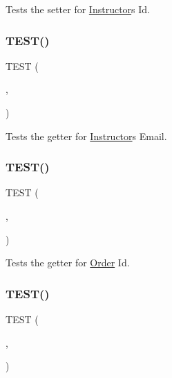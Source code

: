 Tests the setter for \hyperlink{classInstructor}{Instructor}\textquotesingle{}s Id. \mbox{\label{group__group2_ga14b68f5d4a879f5c32075d25bcd1b058}} 
\subsubsection{\texorpdfstring{T\+E\+S\+T()}{TEST()}\hspace{0.1cm}{\footnotesize\ttfamily [37/54]}}
{\footnotesize\ttfamily T\+E\+ST (\begin{DoxyParamCaption}\item[{instructor\+Test}]{,  }\item[{get\+Instr\+Id\+Test}]{ }\end{DoxyParamCaption})}

Tests the getter for \hyperlink{classInstructor}{Instructor}\textquotesingle{}s Email. \mbox{\label{group__group2_gab3cc359b32bb3e07aece88abee38991d}} 
\subsubsection{\texorpdfstring{T\+E\+S\+T()}{TEST()}\hspace{0.1cm}{\footnotesize\ttfamily [38/54]}}
{\footnotesize\ttfamily T\+E\+ST (\begin{DoxyParamCaption}\item[{order\+Test}]{,  }\item[{get\+Order\+Id\+Test}]{ }\end{DoxyParamCaption})}

Tests the getter for \hyperlink{classOrder}{Order} Id. \mbox{\label{group__group2_ga133872a9e6fe94a464244f8d2c31f4d4}} 
\subsubsection{\texorpdfstring{T\+E\+S\+T()}{TEST()}\hspace{0.1cm}{\footnotesize\ttfamily [39/54]}}
{\footnotesize\ttfamily T\+E\+ST (\begin{DoxyParamCaption}\item[{order\+Test}]{,  }\item[{set\+Order\+Id\+Test}]{ }\end{DoxyParamCaption})}

